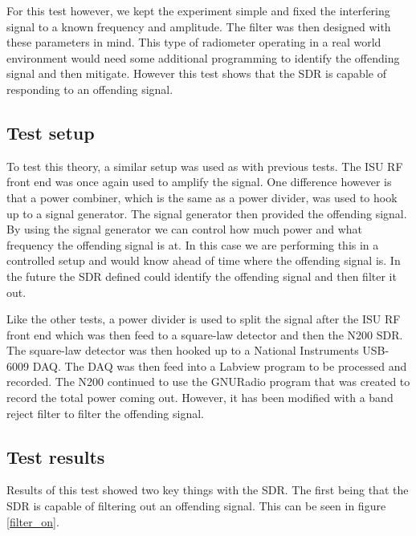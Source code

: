 For this test however, we kept the experiment simple and fixed the interfering signal to a known frequency and amplitude.  The filter was then designed with these parameters in mind.  This type of radiometer operating in a real world environment would need some additional programming to identify the offending signal and then mitigate.  However this test shows that the SDR is capable of responding to an offending signal.

\subsection{Test setup}
To test this theory, a similar setup was used as with previous tests.  The ISU RF front end was once again used to amplify the signal.  One difference however is that a power combiner, which is the same as a power divider, was used to hook up to a signal generator.  The signal generator then provided the offending signal.  By using the signal generator we can control how much power and what frequency the offending signal is at.  In this case we are performing this in a controlled setup and would know ahead of time where the offending signal is.  In the future the SDR defined could identify the offending signal and then filter it out.

Like the other tests, a power divider is used to split the signal after the ISU RF front end which was then feed to a square-law detector and then the N200 SDR.  The square-law detector was then hooked up to a National Instruments USB-6009 DAQ.  The DAQ was then feed into a Labview program to be processed and recorded.  The N200 continued to use the GNURadio program that was created to record the total power coming out.  However, it has been modified with a band reject filter to filter the offending signal.

\subsection{Test results}
Results of this test showed two key things with the SDR.  The first being that the SDR is capable of filtering out an offending signal.  This can be seen in figure \ref{filter_on}.

